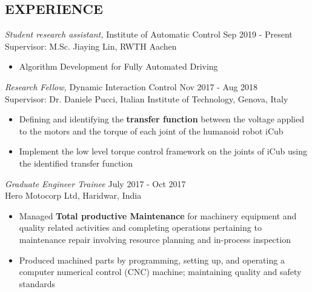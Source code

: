 \documentclass[margin, 10pt]{res} %
\begin{document}
\begin{resume}
\section{EXPERIENCE}

{\sl Student research assistant, }Institute of Automatic Control \hfill Sep 2019 - Present \\
Supervisor: M.Sc. Jiaying Lin, RWTH Aachen\\

\begin{itemize}
	\item  Algorithm Development for Fully Automated Driving
	
\end{itemize} 

{\sl Research Fellow, }Dynamic Interaction Control \hfill Nov 2017 - Aug 2018 \\
Supervisor: Dr. Daniele Pucci, Italian Institute of Technology, Genova, Italy\\

\begin{itemize}
	\item  Defining and identifying the \textbf{transfer function} between the voltage applied to the motors and the torque of each joint of the humanoid robot iCub
	\item  Implement the low level torque control framework on the joints of iCub using the identified transfer function

\end{itemize} 

{\sl Graduate Engineer Trainee} \hfill July 2017 - Oct 2017 \\
Hero Motocorp Ltd, Haridwar, India\\

\begin{itemize}
	\item Managed \textbf{Total productive Maintenance} for machinery
	equipment and quality related activities and completing operations pertaining to maintenance repair
	involving resource planning and in-process inspection
	\item Produced machined parts by programming, setting up, and operating a computer numerical control (CNC) machine;
	maintaining quality and safety standards


\end{itemize}
\end{resume}
\end{document}

